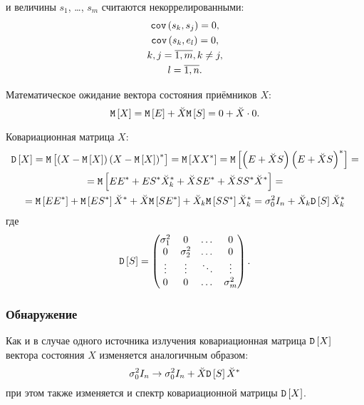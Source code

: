 и величины $s_1$, \dots, $s_m$ считаются некоррелированными:
\begin{gather*}
    \mathtt{cov} \left ( s_k, s_j \right ) = 0 , \\
    \mathtt{cov} \left ( s_k, e_l \right ) = 0 , \\
    k,j = \overline{1,m}, k \neq j, \\
    l = \overline{1, n} .
\end{gather*}

Математическое ожидание вектора состояния приёмников $X$:
\[
    \mathtt{M} \left [ X \right ]
    = \mathtt{M} \left [ E \right ] + \breve{X} \mathtt{M} \left [ S \right ]
    = 0 + \breve{X} \cdot 0 .
\]

Ковариационная матрица $X$:
\begin{multline*}
    \mathtt{D} \left [ X \right ]
    = \mathtt{M} \left [ \left ( X - \mathtt{M} \left [ X \right ] \right ) \left ( X - \mathtt{M} \left [ X \right ] \right )^* \right ]
    = \mathtt{M} \left [ X X^* \right ]
    = \mathtt{M} \left [ \left ( E + \breve{X} S \right ) \left ( E + \breve{X} S \right )^* \right ] = \\
    = \mathtt{M} \left [ E E^* + E S^* \breve{X}_k^* + \breve{X} S E^* + \breve{X} S S^* \breve{X}^* \right ] = \\
    = \mathtt{M} \left [ E E^* \right ] + \mathtt{M} \left [ E S^* \right ] \breve{X}^* + \breve{X} \mathtt{M} \left [ S E^* \right ] + \breve{X}_k \mathtt{M} \left [ S S^* \right ] \breve{X}_k^*
    = \sigma_0^2 I_n + \breve{X}_k \mathtt{D} \left [ S \right ] \breve{X}_k^*
\end{multline*}
где
\begin{gather*}
    \mathtt{D} \left [ S \right ] =
    \begin{pmatrix}
        \sigma_1^2 & 0          & \dots  & 0          \\
        0          & \sigma_2^2 & \dots  & 0          \\
        \vdots     & \vdots     & \ddots & \vdots     \\
        0          & 0          & \dots  & \sigma_m^2
    \end{pmatrix} .
\end{gather*}

\subsubsection{Обнаружение}

Как и в случае одного источника излучения ковариационная матрица $\mathtt{D} \left [ X \right ]$ вектора состояния $X$ изменяется аналогичным образом:
\[
    \sigma_0^2 I_n \rightarrow \sigma_0^2 I_n + \breve{X} \mathtt{D} \left [ S \right ] \breve{X}^*
\]
при этом также изменяется и спектр ковариационной матрицы $\mathtt{D} \left [ X \right ]$.


